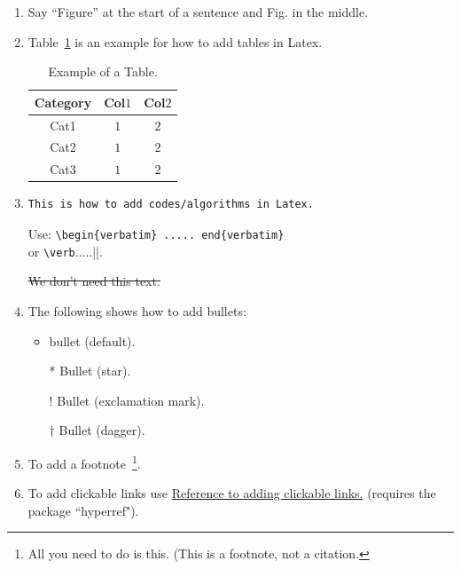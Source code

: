 \documentclass[pre,aps,reprint,noshowpacs,superscriptaddress,floatfix,letterpaper,longbibliography]{revtex4-2}
\begin{document}
\begin{enumerate}
\item Say ``Figure'' at the start of a sentence and Fig. in the middle.  

\item Table~\ref{Table1} is an example for how to add tables in Latex. 
\begin{table}[h!] 
\footnotesize
\begin{tabular}{| c | c | c |} %
\hline\hline 
Category & Col$1$ & Col$2$\\
[0.5ex] %
\hline 
Cat1&$1$&$2$\\
Cat2&$1$&$2$\\
Cat3&$1$&$2$\\
[0.5ex]
\hline\hline 
\end{tabular} 
\caption{\footnotesize{Example of a Table.}}
\label{Table1} 
\end{table} 


\item \begin{verbatim}
This is how to add codes/algorithms in Latex.
\end{verbatim} 
Use: \verb|\begin{verbatim} ..... end{verbatim}|  \\ 
or \verb|\verb|.....||. 

\st{We don't need this text.}

\item The following shows how to add bullets: 
\begin{itemize}
  \item bullet (default). 
  \item[*] Bullet (star). 
  \item[!] Bullet (exclamation mark).  
  \item[$\dagger$] Bullet (dagger). 
  \label{ListBullets}
\end{itemize}

\item To add a footnote~\footnote{All you need to do is this. (This is a footnote, not a citation.}. 

\item To add clickable links use 
\href{https://latex-tutorial.com/tutorials/hyperlinks/}{Reference to adding clickable links.} (requires the package ``hyperref"). 


\end{enumerate}
\end{document}
